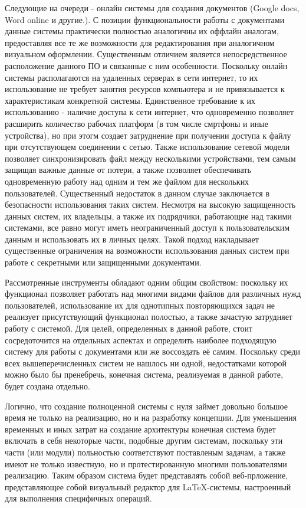 Следующие на очереди - онлайн системы для создания документов (Google docs, Word online и другие.). С позиции функциональности работы с документами данные системы практически полностью аналогичны их оффлайн аналогам, предоставляя все те же возможности для редактирования при аналогичном визуальном оформлении. Существенным отличием является непосредственное расположение данного ПО и связанные с ним особенности. Поскольку онлайн системы располагаются на удаленных серверах в сети интернет, то их использование не требует занятия ресурсов компьютера и не привязывается к характеристикам конкретной системы. Единственное требование к их использованию - наличие доступа к сети интернет, что одновременно позволяет расширить количество рабочих платформ (в том числе смртфоны и иные устройства), но при этогм создает затруднение при получении доступа к файлу при отсутствующем соединении с сетью. Также использование сетевой модели позволяет синхронизировать файл между несколькими устройствами, тем самым защищая важные данные от потери, а также позволяет обеспечивать одновременную работу над одним и тем же файлом для нескольких пользователей. Существенный недостаток в данном случае заключается в безопасности использования таких систем. Несмотря на высокую защищенность данных систем, их владельцы, а также их подрядчики, работающие над такими системами, все равно могут иметь неограниченный доступ к пользовательским данным и использовать их в личных целях. Такой подход накладывает существенные ограничения на возможности использования данных систем при работе с секретными или защищенными документами.

Рассмотренные инструменты обладают одним общим свойством: поскольку их функционал позволяет работать над многими видами файлов для различных нужд пользователей,  использование их для однотипных повторяющихся задач не реализует присутствующий функционал полостью, а также зачастую затрудняет работу с системой. Для целей, определенных в данной работе, стоит сосредоточится на отдельных аспектах и определить наиболее подходящую систему для работы с документами или же воссоздать её самим. Поскольку среди всех вышеперечисленных систем не нашлось ни одной, недостатками которой можно было бы пренебречь, конечная система, реализуемая в данной работе, будет создана отдельно.

Логично, что создание полноценной системы с нуля займет довольно большое время не только на реализацию, но и на разработку концепции. Для уменьшения временных и иных затрат на создание архитектуры конечная система будет включать в себя некоторые части, подобные другим системам, поскольку эти части (или модули) польностью соответствуют поставленым задачам, а также имеют не только известную, но и протестированную многими пользователями реализацию. Таким образом система будет представлять собой веб-прложение,  представляющее собой визуальный редактор для LaTeX-системы, настроенный для выполнения специфичных операций. 

